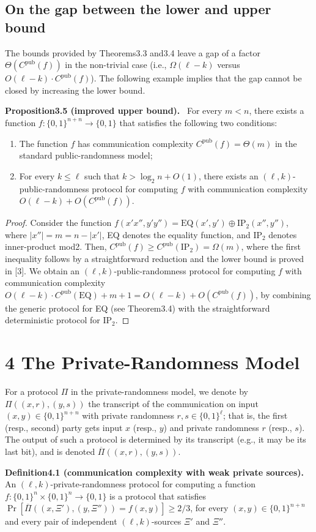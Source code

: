 \documentclass[10pt,a4paper]{article}
\newenvironment{authorclaim}[1]{\par\medskip\noindent\textbf{#1.}\ }{\par\medskip}
\begin{document}
\subsection*{On the gap between the lower and upper bound}
The bounds provided by Theorems3.3 and3.4 leave a gap of a factor $\Theta(C^{\mathrm{pub}}(f))$ in the non-trivial case (i.e., $\Omega(\ell-k)$ versus $O(\ell-k)\cdot C^{\mathrm{pub}}(f)$). The following example implies that the gap cannot be closed by increasing the lower bound.
\begin{authorclaim}{Proposition3.5 (improved upper bound)}
For every $m<n$, there exists a function $f:\{0,1\}^{n+n}\to\{0,1\}$ that satisfies the following two conditions:
\begin{enumerate}
\item The function $f$ has communication complexity $C^{\mathrm{pub}}(f)=\Theta(m)$ in the standard public-randomness model;
\item For every $k\le\ell$ such that $k>\log_2n+O(1)$, there exists an $(\ell,k)$-public-randomness protocol for computing $f$ with communication complexity $O(\ell-k)+O(C^{\mathrm{pub}}(f))$.
\end{enumerate}
\end{authorclaim}
\begin{proof}
Consider the function $f(x'x'',y'y'')=\mathrm{EQ}(x',y')\oplus\mathrm{IP}_2(x'',y'')$, where $|x''|=m=n-|x'|$, EQ denotes the equality function, and $\mathrm{IP}_2$ denotes inner-product mod2. Then, $C^{\mathrm{pub}}(f)\ge C^{\mathrm{pub}}(\mathrm{IP}_2)=\Omega(m)$, where the first inequality follows by a straightforward reduction and the lower bound is proved in [3]. We obtain an $(\ell,k)$-public-randomness protocol for computing $f$ with communication complexity $O(\ell-k)\cdot C^{\mathrm{pub}}(\mathrm{EQ})+m+1=O(\ell-k)+O(C^{\mathrm{pub}}(f))$, by combining the generic protocol for EQ (see Theorem3.4) with the straightforward deterministic protocol for $\mathrm{IP}_2$.
\end{proof}
\section*{4 The Private-Randomness Model}
For a protocol $\Pi$ in the private-randomness model, we denote by $\Pi((x,r),(y,s))$ the transcript of the communication on input $(x,y)\in\{0,1\}^{n+n}$ with private randomness $r,s\in\{0,1\}^\ell$; that is, the first (resp., second) party gets input $x$ (resp., $y$) and private randomness $r$ (resp., $s$). The output of such a protocol is determined by its transcript (e.g., it may be its last bit), and is denoted $\overline\Pi((x,r),(y,s))$.
\begin{authorclaim}{Definition4.1 (communication complexity with weak private sources)}
An $(\ell,k)$-private-randomness protocol for computing a function $f:\{0,1\}^n\times\{0,1\}^n\to\{0,1\}$ is a protocol that satisfies $\Pr[\overline\Pi((x,\Xi'),(y,\Xi''))=f(x,y)]\ge2/3$, for every $(x,y)\in\{0,1\}^{n+n}$ and every pair of independent $(\ell,k)$-sources $\Xi'$ and $\Xi''$.
\end{authorclaim}
\end{document}
